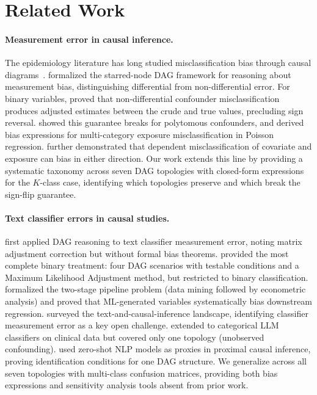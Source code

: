 \section{Related Work}
\label{sec:related_work}

\paragraph{Measurement error in causal inference.}
The epidemiology literature has long studied misclassification bias through causal diagrams~\cite{gustafson2004}. \citet{hernan_cole2009} formalized the starred-node DAG framework for reasoning about measurement bias, distinguishing differential from non-differential error. For binary variables, \citet{ogburn_vanderweele2012} proved that non-differential confounder misclassification produces adjusted estimates between the crude and true values, precluding sign reversal. \citet{brenner1993} showed this guarantee breaks for polytomous confounders, and \citet{veirod_laake2001} derived bias expressions for multi-category exposure misclassification in Poisson regression. \citet{edwards_lessler_naimi2021} further demonstrated that dependent misclassification of covariate and exposure can bias in either direction. Our work extends this line by providing a systematic taxonomy across seven DAG topologies with closed-form expressions for the $K$-class case, identifying which topologies preserve and which break the sign-flip guarantee.

\paragraph{Text classifier errors in causal studies.}
\citet{wood_doughty2018} first applied DAG reasoning to text classifier measurement error, noting matrix adjustment correction but without formal bias theorems. \citet{teblunthuis2024} provided the most complete binary treatment: four DAG scenarios with testable conditions and a Maximum Likelihood Adjustment method, but restricted to binary classification. \citet{yang_adomavicius2018} formalized the two-stage pipeline problem (data mining followed by econometric analysis) and proved that ML-generated variables systematically bias downstream regression. \citet{keith_jensen_oconnor2020} surveyed the text-and-causal-inference landscape, identifying classifier measurement error as a key open challenge. \citet{lee_wood_doughty2024} extended to categorical LLM classifiers on clinical data but covered only one topology (unobserved confounding). \citet{chen_bhattacharya_keith2024} used zero-shot NLP models as proxies in proximal causal inference, proving identification conditions for one DAG structure. We generalize across all seven topologies with multi-class confusion matrices, providing both bias expressions and sensitivity analysis tools absent from prior work.

